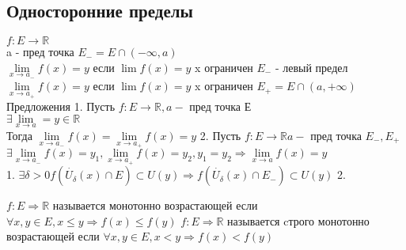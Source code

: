\subsection{Односторонние пределы}

$ f : E \rightarrow \mathbb{R} $ \\
a - пред точка $E_- = E \cap (-\infty, a) $\\
$  \lim\limits_{x \rightarrow a_-} f(x) = y $ если $ \lim f(x) = y $ x ограничен $ E_- $ - левый предел \\
$  \lim\limits_{x \rightarrow a_+} f(x) = y $ если $ \lim f(x) = y $ x ограничен $ E_+ = E \cap (a, +\infty)$  \\
Предложения
1. Пусть $ f:E\rightarrow \mathbb{R} ,a - $ пред точка Е \\
$ \exists \lim\limits_{x \rightarrow a} = y \in \mathbb{R} $ \\
Тогда $  \lim\limits_{x \rightarrow a_-} f(x)  =  \lim\limits_{x \rightarrow a_+} f(x)= y$
2. Пусть $ f : E \rightarrow \mathbb{R} a - $ пред точка $ E_-, E_+ $\\
$ \exists  \lim\limits_{x \rightarrow a_-} f(x) = y_1,  \lim\limits_{x \rightarrow a_+} f(x) = y_2, y_1 = y_2 \Rightarrow  \lim\limits_{x \rightarrow a} f(x) = y $ \\
1. $ \exists \delta > 0 f(\dot{U_{\delta}}(x) \cap E ) \subset U(y)  \Rightarrow  f(\dot{U_{\delta}}(x) \cap E_- ) \subset U(y)   $
2. %

\begin{definition}
	 $ f : E \Rightarrow \mathbb{R} $ называется монотонно возрастающей если $ \forall x, y \in E, x \leq y \Rightarrow f(x) \leq f(y)$
	 $ f : E \Rightarrow \mathbb{R} $ называется cтрого монотонно возрастающей если $ \forall x, y \in E, x < y \Rightarrow f(x) < f(y)$
\end{definition}

